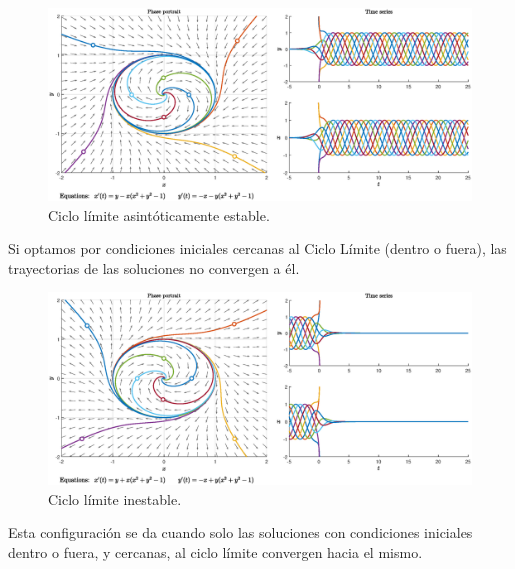 \documentclass[12pt,a4paper]{report} %
\begin{document}
		\begin{figure}[h]
			\centering
			\includegraphics[width=1\textwidth]{cle.eps}
			\caption{Ciclo límite asintóticamente estable.}
			\label{fig:cle}
		\end{figure}\smallskip
		
	\vspace{1cm}
	
	\vspace{0.5cm}Si optamos por condiciones iniciales cercanas al Ciclo Límite (dentro o fuera), las trayectorias de las soluciones no convergen a él.
	
	\begin{figure}[h]
		\centering
		\includegraphics[width=1\textwidth]{cli.eps}
		\caption{Ciclo límite inestable.}
		\label{fig:cli}
	\end{figure}\smallskip
	
	\newpage
	
	\vspace{0.5cm}
	
	\vspace{0.5cm}Esta configuración se da cuando solo las soluciones con condiciones iniciales dentro o fuera, y cercanas, al ciclo límite convergen hacia el mismo.
	
\end{document}
